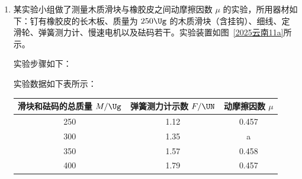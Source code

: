 \documentclass[\gkver]{gaokaozhenti}
\begin{document}
\begin{enumerate}
{$\Delta E = \mu mg \cos \theta \cdot L$

结合 $-mg \sin \theta \cdot L - \mu mg \cos \theta \cdot L = 0 - \frac{1}{2}mv_{0}^{2}$

可得 $\Delta E = \frac{1}{4}mv_{0}^{2}$

故 B 正确；

C．设过程 Ⅱ 中，Q 从 P 点沿斜面向上运动的最大位移为 $x$，根据能量守恒定律

$\frac{1}{2}kL^{2} = mg \sin \theta \cdot x + \mu mg \cos \theta \cdot x + \frac{1}{2}k(x - L)^{2}$

结合 $-mg \sin \theta \cdot L - \mu mg \cos \theta \cdot L = 0 - \frac{1}{2}mv_{0}^{2}$

解得 $x = \frac{kv_{0}^{2} - 8mg^{2}\sin^{2}\theta}{2kg\sin\theta}$

故 C 正确；

D．无论 Q 从何处释放，Q 在斜面上运动过程中，弹簧与 Q 初始时的势能变为摩擦热，当在 M 点时，满足 $kL_{1} = mg \sin \theta + \mu mg \cos \theta$

当在 O 点时，满足 $mg \sin \theta = \mu mg \cos \theta$

所以在 OM（含 O、M 点）之间速度为零时，Q 将静止，故 D 正确。

故选 BCD。
}

\item
某实验小组做了测量木质滑块与橡胶皮之间动摩擦因数 $\mu$ 的实验，所用器材如下：钉有橡胶皮的长木板、质量为 $250 \Ug$ 的木质滑块（含挂钩）、细线、定滑轮、弹簧测力计、慢速电机以及砝码若干。实验装置如图~\ref{2025云南11a}所示。

实验步骤如下：

实验数据如下表所示：
\begin{center}
\begin{tabular}{|c|c|c|}
\hline
滑块和砝码的总质量 $M/\Ug$ & 弹簧测力计示数 $F/\UN$ & 动摩擦因数 $\mu$ \\
\hline
250 & 1.12 & 0.457 \\
\hline
300 & 1.35 & a \\
\hline
350 & 1.57 & 0.458 \\
\hline
400 & 1.79 & 0.457 \\
\hline
\end{tabular}
\end{center}


\end{enumerate}
\end{document}
